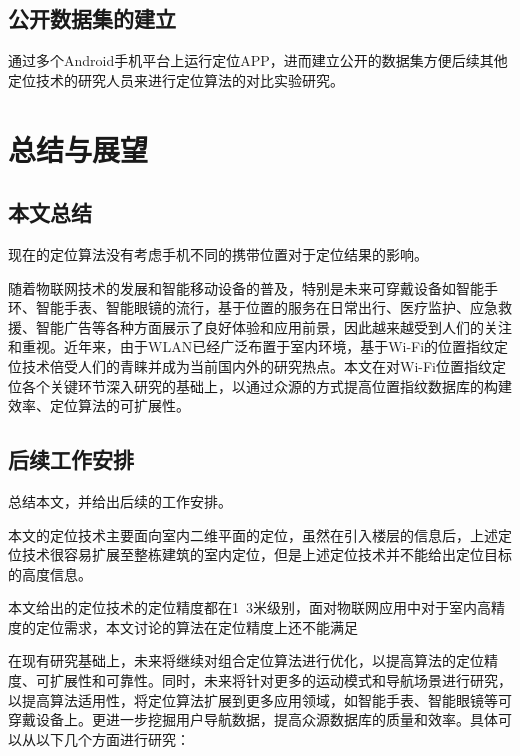 \section{公开数据集的建立}

通过多个Android手机平台上运行定位APP，进而建立公开的数据集方便后续其他定位技术的研究人员来进行定位算法的对比实验研究。




\chapter{总结与展望}

\section{本文总结}

现在的定位算法没有考虑手机不同的携带位置对于定位结果的影响。

随着物联网技术的发展和智能移动设备的普及，特别是未来可穿戴设备如智能手环、智能手表、智能眼镜的流行，基于位置的服务在日常出行、医疗监护、应急救援、智能广告等各种方面展示了良好体验和应用前景，因此越来越受到人们的关注和重视。近年来，由于WLAN已经广泛布置于室内环境，基于Wi-Fi的位置指纹定位技术倍受人们的青睐并成为当前国内外的研究热点。本文在对Wi-Fi位置指纹定位各个关键环节深入研究的基础上，以通过众源的方式提高位置指纹数据库的构建效率、定位算法的可扩展性。

\section{后续工作安排}

总结本文，并给出后续的工作安排。

本文的定位技术主要面向室内二维平面的定位，虽然在引入楼层的信息后，上述定位技术很容易扩展至整栋建筑的室内定位，但是上述定位技术并不能给出定位目标的高度信息。

本文给出的定位技术的定位精度都在1~3米级别，面对物联网应用中对于室内高精度的定位需求，本文讨论的算法在定位精度上还不能满足

在现有研究基础上，未来将继续对组合定位算法进行优化，以提高算法的定位精度、可扩展性和可靠性。同时，未来将针对更多的运动模式和导航场景进行研究，以提高算法适用性，将定位算法扩展到更多应用领域，如智能手表、智能眼镜等可穿戴设备上。更进一步挖掘用户导航数据，提高众源数据库的质量和效率。具体可以从以下几个方面进行研究：

